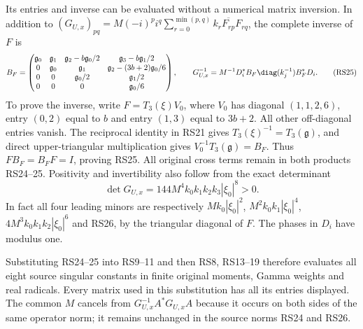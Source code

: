 Its entries and inverse can be evaluated without a numerical
matrix inversion. In addition to
$(G_{U,x})_{pq}=M(-i)^p i^q
\sum_{r=0}^{\min(p,q)}k_r\overline{F_{rp}}F_{rq}$,
the complete inverse of $F$ is
\begin{equation}
 B_F=\begin{pmatrix}
 \mathfrak g_0&\mathfrak g_1&\mathfrak g_2-b\mathfrak g_0/2
                       &\mathfrak g_3-b\mathfrak g_1/2\\
 0&\mathfrak g_0&\mathfrak g_1
                       &\mathfrak g_2-(3b+2)\mathfrak g_0/6\\
 0&0&\mathfrak g_0/2&\mathfrak g_1/2\\
 0&0&0&\mathfrak g_0/6
 \end{pmatrix},\qquad
 G_{U,x}^{-1}=M^{-1}D_i^*B_F\diag(k_j^{-1})B_F^*D_i.
 \tag{RS25}
\end{equation}
To prove the inverse, write
$F=T_3(\xi)V_0$, where $V_0$ has diagonal $(1,1,2,6)$,
entry $(0,2)$ equal to $b$ and entry $(1,3)$ equal to $3b+2$.
All other off-diagonal entries vanish. The reciprocal identity
in RS21 gives $T_3(\xi)^{-1}=T_3(\mathfrak g)$, and direct
upper-triangular multiplication gives $V_0^{-1}T_3(\mathfrak g)=B_F$.
Thus $FB_F=B_FF=I$, proving RS25. All original cross terms
remain in both products RS24--25. Positivity and invertibility
also follow from the exact determinant
\begin{equation}
 \det G_{U,x}=144M^4 k_0k_1k_2k_3|\xi_0|^8>0.
 \tag{RS26}
\end{equation}
In fact all four leading minors are respectively
$Mk_0|\xi_0|^2$, $M^2k_0k_1|\xi_0|^4$,
$4M^3k_0k_1k_2|\xi_0|^6$ and RS26, by the triangular
diagonal of $F$. The phases in $D_i$ have modulus one.

Substituting RS24--25 into RS9--11 and then RS8, RS13--19
therefore evaluates all eight source singular constants in
finite original moments, Gamma weights and real radicals.
Every matrix used in this substitution has all its entries
displayed. The common $M$ cancels from $G_{U,x}^{-1}A^*G_{U,x}A$
because it occurs on both sides of the same operator norm;
it remains unchanged in the source norms RS24 and RS26.

